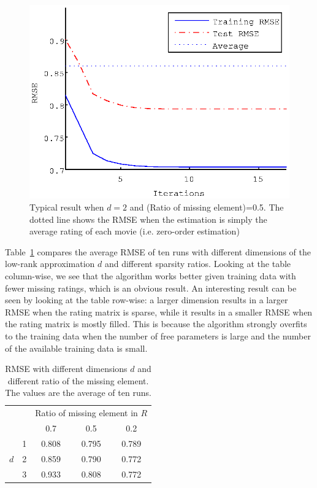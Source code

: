 \documentclass{article}
\begin{document}
\begin{figure}[ht]
  \begin{center}
    \includegraphics[scale=0.6]{figure/lrem_typical_plot}
  \end{center}
  \caption{Typical result when $d = 2$ and (Ratio of missing element)=0.5. The dotted line shows the RMSE when the estimation is simply the average rating of each movie (i.e. zero-order estimation)}
  \label{fig:lrem_typical_plot}
\end{figure}

Table~\ref{table:lrem_result} compares the average RMSE of ten runs
with different dimensions of the low-rank approximation $d$ and
different sparsity ratios. Looking at the table column-wise, we see
that the algorithm works better given training data with fewer missing
ratings, which is an obvious result. An interesting result can be seen
by looking at the table row-wise: a larger dimension results in a
larger RMSE when the rating matrix is sparse, while it results in a
smaller RMSE when the rating matrix is mostly filled. This is because
the algorithm strongly overfits to the training data when the number
of free parameters is large and the number of the available training
data is small.

\begin{table}[ht]
 \caption{RMSE with different dimensions $d$ and different ratio of the missing element. The values are the average of ten runs.}
 \label{table:lrem_result}
 \begin{center}
  \begin{tabular}{|c|c||c|c|c|}
    \hline
    \multicolumn{2}{|c|}{}  & \multicolumn{3}{|c|}{Ratio of missing element in $R$} \\
    \cline{3-5}
     \multicolumn{2}{|c|}{}    &  0.7  &  0.5  & 0.2   \\
    \hline
    \hline
       & 1 &  0.808  &  0.795  &  0.789  \\
    \cline{2-5}
     $d$ & 2 &  0.859  &  0.790  & 0.772   \\
    \cline{2-5}
     & 3 &  0.933  &  0.808  &  0.772  \\
    \hline
  \end{tabular}
 \end{center}
\end{table}
\end{document}
